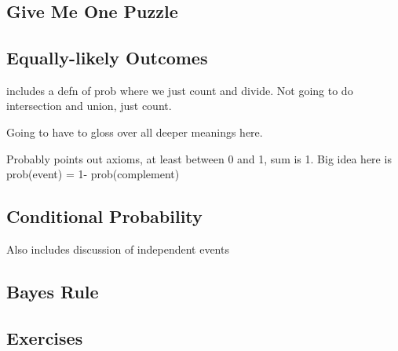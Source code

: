 \section{\secprob}
\label{sec_prob}

\subsection{Give Me One Puzzle} %

\subsection{Equally-likely Outcomes}

includes a defn of prob where we just count and divide.  Not going to do intersection and union, just count.

Going to have to gloss over all deeper meanings here.

Probably points out axioms, at least between 0 and 1, sum is 1.  Big idea here is prob(event) = 1- prob(complement)  

\subsection{Conditional Probability}

Also includes discussion of independent events

\subsection{Bayes Rule}

\subsection{
Exercises}




